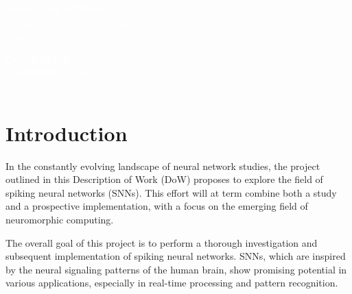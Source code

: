 \documentclass[11pt]{article}
\begin{document}
\pagecolor{darkbluegrey}
\afterpage{\nopagecolor}


\begin{titlepage}
  \begin{center}
    \textcolor{white}{\textbf{\Huge Description of Work}}\\ %
    \vspace{1cm}
    \textcolor{white}{\Large Sound Detection and Classification\\using Spiking Neural Networks} %
    \vspace{3cm}
  \end{center}
  \begin{center}
    \textcolor{white}{ %
      \textbf{COURREGE Téo}\\
      \textbf{GANDEEL Lo'aï}\\
      \vspace{1cm}
      \Large Date: \today}
  \end{center}
\end{titlepage}

\newpage

\tableofcontents

\pagebreak

\section{Introduction}

In the constantly evolving landscape of neural network studies, the project outlined in this Description of Work (DoW) proposes to explore the field of spiking neural networks (SNNs). This effort will at term combine both a study and a prospective implementation, with a focus on the emerging field of neuromorphic computing.

The overall goal of this project is to perform a thorough investigation and subsequent implementation of spiking neural networks. SNNs, which are inspired by the neural signaling patterns of the human brain, show promising potential in various applications, especially in real-time processing and pattern recognition.
\end{document}
